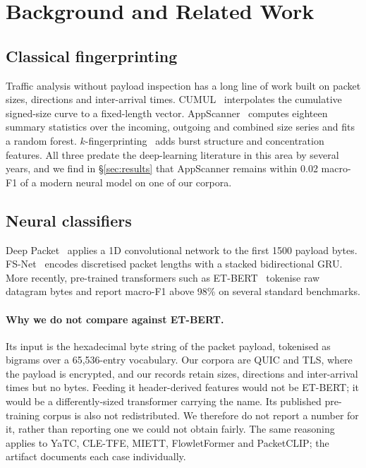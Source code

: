 \section{Background and Related Work}
\label{sec:background}

\subsection{Classical fingerprinting}

Traffic analysis without payload inspection has a long line of work built on
packet sizes, directions and inter-arrival times. CUMUL~\cite{panchenko2016website}
interpolates the cumulative signed-size curve to a fixed-length vector.
AppScanner~\cite{taylor2016appscanner} computes eighteen summary statistics over
the incoming, outgoing and combined size series and fits a random forest.
$k$-fingerprinting~\cite{hayes2016kfingerprinting} adds burst structure and
concentration features. All three predate the deep-learning literature in this
area by several years, and we find in \S\ref{sec:results} that AppScanner
remains within 0.02 macro-F1 of a modern neural model on one of our corpora.

\subsection{Neural classifiers}

Deep Packet~\cite{lotfollahi2020deeppacket} applies a 1D convolutional network
to the first 1500 payload bytes. FS-Net~\cite{liu2019fsnet} encodes discretised
packet lengths with a stacked bidirectional GRU. More recently, pre-trained
transformers such as ET-BERT~\cite{lin2022etbert} tokenise raw datagram bytes
and report macro-F1 above 98\% on several standard benchmarks.

\paragraph{Why we do not compare against ET-BERT.} Its input is the hexadecimal
byte string of the packet payload, tokenised as bigrams over a 65{,}536-entry
vocabulary. Our corpora are QUIC and TLS, where the payload is encrypted, and
our records retain sizes, directions and inter-arrival times but no bytes.
Feeding it header-derived features would not be ET-BERT; it would be a
differently-sized transformer carrying the name. Its published pre-training
corpus is also not redistributed. We therefore do not report a number for it,
rather than reporting one we could not obtain fairly. The same reasoning
applies to YaTC, CLE-TFE, MIETT, FlowletFormer and PacketCLIP; the artifact
documents each case individually.

